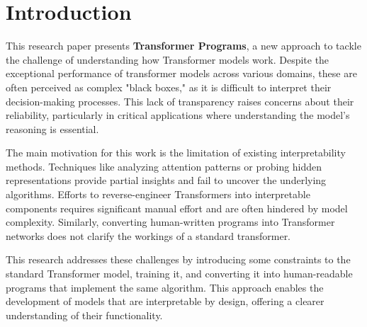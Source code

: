 
\section{Introduction}
\label{ch:introduction}


This research paper presents \textbf{Transformer Programs}, a new approach to tackle the challenge of understanding how Transformer models work. Despite the exceptional performance of transformer models across various domains, these are often perceived as complex "black boxes," as it is difficult to interpret their decision-making processes. This lack of transparency raises concerns about their reliability, particularly in critical applications where understanding the model's reasoning is essential.

The main motivation for this work is the limitation of existing interpretability methods. Techniques like analyzing attention patterns or probing hidden representations provide partial insights and fail to uncover the underlying algorithms. Efforts to reverse-engineer Transformers into interpretable components requires significant manual effort and are often hindered by model complexity. Similarly, converting human-written programs into Transformer networks does not clarify the workings of a standard transformer.

This research addresses these challenges by introducing some constraints to the standard Transformer model, training it, and converting it into human-readable programs that implement the same algorithm. This approach enables the development of models that are interpretable by design, offering a clearer understanding of their functionality.